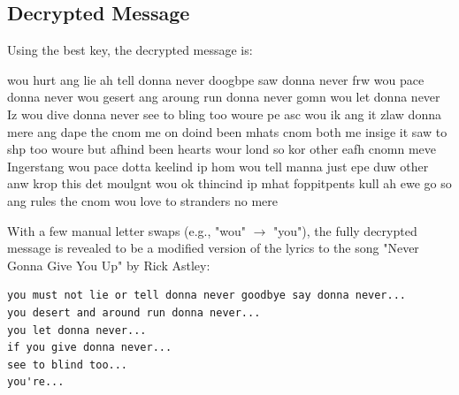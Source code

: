 \documentclass{article}
\begin{document}
\subsection*{Decrypted Message}


Using the best key, the decrypted message is:

wou hurt ang lie ah tell donna never doogbpe saw donna never frw wou pace donna never wou gesert ang aroung run donna never gomn wou let donna never Iz wou dive donna never see to bling too woure pe asc wou ik ang it zlaw donna mere ang dape the cnom me on doind been mhats cnom both me insige it saw to shp too woure but afhind been hearts wour lond so kor other eafh cnomn meve Ingerstang wou pace dotta keelind ip hom wou tell manna just epe duw other anw krop this det moulgnt wou ok thincind ip mhat foppitpents kull ah ewe go so ang rules the cnom wou love to stranders no mere

With a few manual letter swaps (e.g., "wou" $\to$ "you"), the fully decrypted message is revealed to be a modified version of the lyrics to the song "Never Gonna Give You Up" by Rick Astley:
\begin{verbatim}
you must not lie or tell donna never goodbye say donna never... 
you desert and around run donna never... 
you let donna never... 
if you give donna never... 
see to blind too... 
you're...
\end{verbatim}
\end{document}

